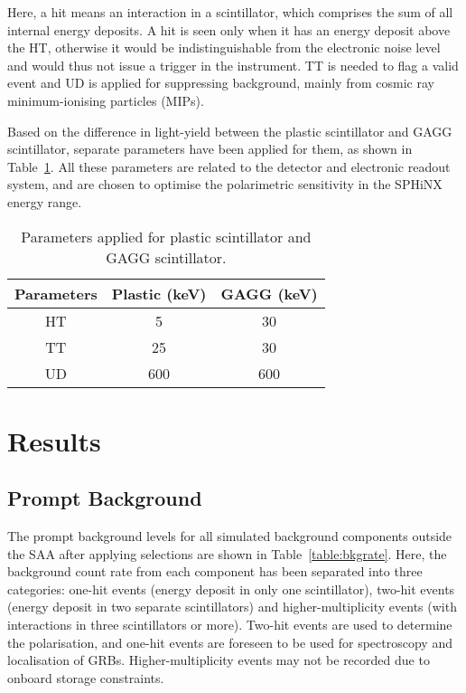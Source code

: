 \documentclass[galaxies,article,accept,moreauthors,pdftex,10pt,a4paper]{mdpi}
\begin{document}
Here, a hit means an interaction in a scintillator, which comprises the sum of all internal energy deposits. A hit is seen only when it has an energy deposit above the HT, otherwise it would be indistinguishable from the electronic noise level and would thus not issue a trigger in the instrument. TT is needed to flag a valid event and UD is applied for suppressing background, mainly from cosmic ray minimum-ionising particles (MIPs).

Based on the difference in light-yield between the plastic scintillator and GAGG scintillator, separate parameters have been applied for them, as shown in Table~\ref{table:cuts}. All these parameters are related to the detector and electronic readout system, and are chosen to optimise the polarimetric sensitivity in the SPHiNX energy range.

\begin{table}[H]
\caption{Parameters applied for plastic scintillator and GAGG scintillator.} %
\centering
\begin{tabular}{ccc}
\toprule
\textbf{Parameters}	& \textbf{Plastic (keV)}& \textbf{GAGG (keV)}\\
\midrule
HT	& 	5	&	30	\\
TT	& 	25	&	30	\\
UD	& 	600	&	600	\\
\bottomrule
\end{tabular}
\label{table:cuts}
\end{table}

\section{Results}
\label{sec:results}
\vspace{-6pt}

\subsection{Prompt Background}
The prompt background levels for all simulated background components outside the SAA after applying selections are shown in Table~\ref{table:bkgrate}. Here, the background count rate from each component has been separated into three categories: one-hit events (energy deposit in only one scintillator), two-hit events (energy deposit in two separate scintillators) and higher-multiplicity events (with interactions in three scintillators or more). Two-hit events are used to determine the polarisation, and one-hit events are foreseen to be used for spectroscopy and localisation of GRBs. Higher-multiplicity events may not be recorded due to onboard storage constraints.
\end{document}
